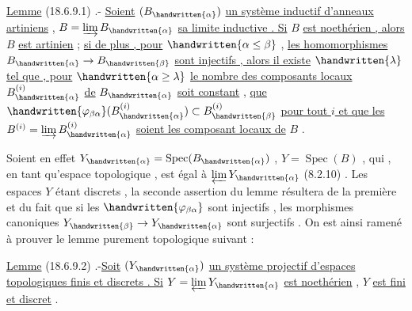 \uline{Lemme} (18.6.9.1) .- \uline{Soient}  $(B_{\handwritten{\alpha}})$ \uline{un système inductif d'anneaux artiniens} ,
$B=\varinjlim B_{\handwritten{\alpha}}$ \uline{sa limite inductive . Si} $B$ \uline{est noethérien , alors} $B$ \uline{est artinien} ;
 \uline{si de plus , pour} $\handwritten{\alpha\leq\beta}$ , \uline{les
homomorphismes} \inserted{\handwritten{$\varphi_{\beta\alpha}:$}} $B_{\handwritten{\alpha}}\to B_{\handwritten{\beta}}$ \uline{sont injectifs , alors il existe} $\handwritten{\lambda}$ \uline{tel que , pour} $\handwritten{\alpha\geq\lambda}$
\uline{le nombre des composants locaux}  $B_{\handwritten{\alpha}}^{(i)}$ \uline{de} $B_{\handwritten{\alpha}}$ \uline{soit constant} , 
\uline{que} $\handwritten{\varphi_{\beta\alpha}}(B_{\handwritten{\alpha}}^{(i)})\subset B_{\handwritten{\beta}}^{(i)}$ \uline{pour tout $i$ et que les} $B^{(i)}=\varinjlim B_{\handwritten{\alpha}}^{(i)}$ \uline{soient les composant
locaux de} $B$ .

Soient en effet $Y_{\handwritten{\alpha}}=\operatorname{Spec}(B_{\handwritten{\alpha}})$ , $Y=\operatorname{Spec}(B)$ , qui , en tant qu'espace topologique
, est égal à $\varprojlim Y_{\handwritten{\alpha}}$ (8.2.10) . Les espaces $Y$ étant   discrets , la seconde
assertion du lemme résultera de la première et du fait que si les $\handwritten{\varphi_{\beta\alpha}}$
sont injectifs , les morphismes canoniques $Y_{\handwritten{\beta}}\to Y_{\handwritten{\alpha}}$ sont surjectifs . On est
ainsi ramené à prouver le lemme purement topologique suivant :

\uline{Lemme} (18.6.9.2) .-\uline{Soit} $(Y_{\handwritten{\alpha}})$ \uline{un système projectif d'espaces topologiques finis
et discrets . Si} $Y=\varprojlim Y_{\handwritten{\alpha}}$ \uline{est noethérien} , $Y$ \uline{est fini et discret} .
